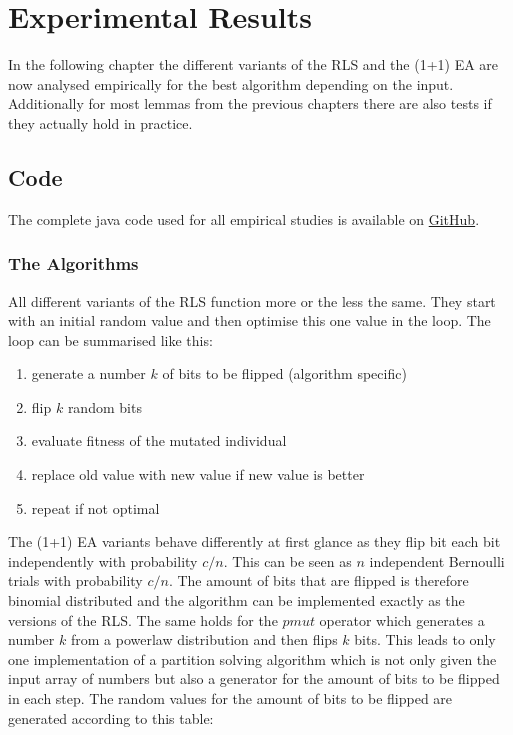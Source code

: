 \chapter{Experimental Results}\label{ch:expRes}

In the following chapter the different variants of the RLS and the (1+1) EA are now analysed empirically for the best algorithm depending on the input.
Additionally for most lemmas from the previous chapters there are also tests if they actually hold in practice.

\section{Code}
The complete java code used for all empirical studies is available on \href{https://github.com/Err404NameNotFound/PartitionSolvingWithEAs}{GitHub}.
\subsection{The Algorithms}
All different variants of the RLS function more or the less the same. They start with an initial random value and then optimise this one value in the loop. The loop can be summarised like this:
\begin{enumerate}
      \item generate a number $k$ of bits to be flipped (algorithm specific)
      \item flip $k$ random bits
      \item evaluate fitness of the mutated individual
      \item replace old value with new value if new value is better
      \item repeat if not optimal
\end{enumerate}
The (1+1) EA variants behave differently at first glance as they flip bit each bit independently with probability $c/n$.
This can be seen as $n$ independent Bernoulli trials with probability $c/n$.
The amount of bits that are flipped is therefore binomial distributed and the algorithm can be implemented exactly as the versions of the RLS. The same holds for the $pmut$ operator which generates a number $k$ from a powerlaw distribution and then flips $k$ bits.
This leads to only one implementation of a partition solving algorithm which is not only given the input array of numbers but also a generator for the amount of bits to be flipped in each step.
The random values for the amount of bits to be flipped are generated according to this table:

